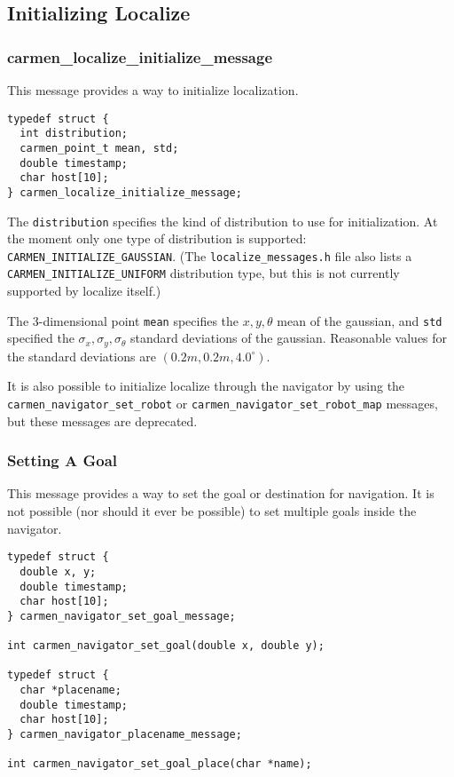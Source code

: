 \documentclass{article}
\begin{document}
\subsection{Initializing Localize}

\subsubsection*{carmen\_localize\_initialize\_message}

This message provides a way to initialize localization.

\begin{verbatim}
typedef struct {
  int distribution;
  carmen_point_t mean, std;
  double timestamp;
  char host[10];
} carmen_localize_initialize_message;
\end{verbatim}

The \verb!distribution! specifies the kind of distribution to use for
initialization. At the moment only one type of distribution is supported:
\verb!CARMEN_INITIALIZE_GAUSSIAN!. (The \verb!localize_messages.h! file also
lists a \verb!CARMEN_INITIALIZE_UNIFORM! distribution type, but this is not
currently supported by localize itself.) 

The 3-dimensional point \verb!mean! specifies the $x, y, \theta$ mean of the
gaussian, and \verb!std! specified the $\sigma_x, \sigma_y, \sigma_\theta$
standard deviations of the gaussian. Reasonable values for the standard
deviations are $(0.2m, 0.2m, 4.0^\circ)$. 

It is also possible to initialize localize through the navigator by using the
\verb!carmen_navigator_set_robot! or \verb!carmen_navigator_set_robot_map! 
messages, but these messages are deprecated.

\subsubsection{Setting A Goal}

This message provides a way to set the goal or destination for navigation. It
is not possible (nor should it ever be possible) to set multiple goals inside
the navigator.

\begin{verbatim}
typedef struct {
  double x, y;
  double timestamp;
  char host[10];
} carmen_navigator_set_goal_message;

int carmen_navigator_set_goal(double x, double y);

typedef struct {
  char *placename;
  double timestamp;
  char host[10];
} carmen_navigator_placename_message;

int carmen_navigator_set_goal_place(char *name);

\end{verbatim}
\end{document}
